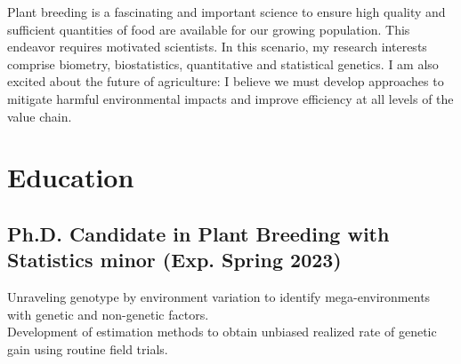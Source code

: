 \documentclass[]{mdkrause_cv_openfont}
\begin{document}
%
%

%
%

%
%

\begin{minipage}[t]{1\textwidth} 

\sectionsep

Plant breeding is a fascinating and important science to ensure high quality and sufficient quantities of food are available for our growing population. This endeavor requires motivated scientists. In this scenario, my research interests comprise biometry, biostatistics, quantitative and statistical genetics. I am also excited about the future of agriculture: I believe we must develop approaches to mitigate harmful environmental impacts and improve efficiency at all levels of the value chain.

\sectionsep


\section{Education} 

\sectionsep

\subsection{Ph.D. Candidate in Plant Breeding with Statistics minor (Exp. Spring 2023)}
 Unraveling genotype by environment variation to identify mega-environments with genetic and non-genetic factors. \\ 
\hspace{1.55 cm} Development of estimation methods to obtain unbiased realized rate of genetic gain using routine field trials.

\sectionsep
\vspace{0.2 mm}


\end{minipage}
\end{document}

